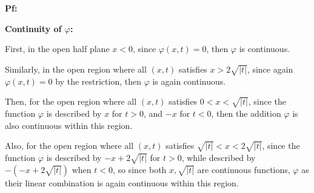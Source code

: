 \documentclass{article}
\begin{document}
\textbf{Pf:}

\textbf{Continuity of $\varphi$:}

First, in the open half plane $x<0$, since $\varphi(x,t)=0$, then $\varphi$ is continuous.

Similarly, in the open region where all $(x,t)$ satisfies $x>2\sqrt{|t|}$, since again $\varphi(x,t)=0$ by the restriction, then $\varphi$ is again continuous.

Then, for the open region where all $(x,t)$ satisfies $0<x<\sqrt{|t|}$, since the function $\varphi$ is described by $x$ for $t>0$, and $-x$ for $t<0$, then the addition $\varphi$ is also continuous within this region.

Also, for the open region where all $(x,t)$ satisfies $\sqrt{|t|}<x<2\sqrt{|t|}$, since the function $\varphi$ is described by $-x+2\sqrt{|t|}$ for $t>0$, while described by $-(-x+2\sqrt{|t|})$ when $t<0$, so since both $x,\sqrt{|t|}$ are continuous functions, $\varphi$ as their linear combination is again continuous within this region.
\end{document}
